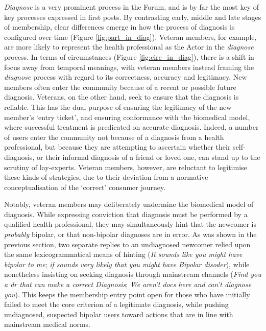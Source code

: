 \documentclass{article}
\begin{document}
\emph{Diagnose} is a very prominent process in the Forum, and is by far the most key of key processes expressed in first posts. By contrasting early, middle and late stages of membership, clear differences emerge in how the process of diagnosis is configured over time (Figure \ref{fig:part_in_diag}). Veteran members, for example, are more likely to represent the health professional as the Actor in the \emph{diagnose} process. In terms of circumstances (Figure \ref{fig:circ_in_diag}), there is a shift in focus away from temporal meanings, with veteran members instead framing the \emph{diagnose} process with regard to its correctness, accuracy and legitimacy. New members often enter the community because of a recent or possible future diagnosis. Veterans, on the other hand, seek to ensure that the diagnosis is reliable. This has the dual purpose of ensuring the legitimacy of the new member's `entry ticket', and ensuring conformance with the biomedical model, where successful treatment is predicated on accurate diagnosis. Indeed, a number of users enter the community not because of a diagnosis from a health professional, but because they are attempting to ascertain whether their self-diagnosis, or their informal diagnosis of a friend or loved one, can stand up to the scrutiny of lay-experts. Veteran members, however, are reluctant to legitimise these kinds of strategies, due to their deviation from a normative conceptualisation of the `correct' consumer journey.

Notably, veteran members may deliberately undermine the biomedical model of diagnosis. While expressing conviction that diagnosis must be performed by a qualified health professional, they may simultaneously hint that the newcomer is \emph{probably} bipolar, or that non-bipolar diagnoses are in error. As was shown in the previous section, two separate replies to an undiagnosed newcomer relied upon the same lexicogrammatical means of hinting (\emph{It sounds like you might have bipolar to me}; \emph{if sounds very likely that you might have Bipolar disoder}), while nonetheless insisting on seeking diagnosis through mainstream channels (\emph{Find you a dr that can make a correct Diagnosis}; \emph{We aren't docs here and can't diagnose you}). This keeps the membership entry point open for those who have initially failed to meet the core criterion of a legitimate diagnosis, while pushing undiagnosed, suspected bipolar users toward actions that are in line with mainstream medical norms. %
\end{document}
